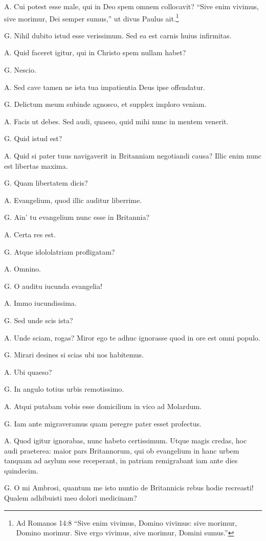 \documentclass{article}
\begin{document}
A. Cui potest esse male, qui in Deo spem omnem collocavit? ``Sive enim vivimus, sive morimur, Dei semper sumus,'' ut divus Paulus ait.\footnote{Ad Romanos 14:8 ``Sive enim vivimus, Domino vivimus: sive morimur, Domino morimur. Sive ergo vivimus, sive morimur, Domini sumus.''}

G. Nihil dubito istud esse verissimum. Sed ea est carnis huius infirmitas.

A. Quid faceret igitur, qui in Christo spem nullam habet?

G. Nescio.

A. Sed cave tamen ne ista tua impatientia Deus ipse offendatur.

G. Delictum meum subinde agnosco, et supplex imploro veniam.

 
A. Facis ut debes. Sed audi, quaeso, quid mihi nunc in mentem venerit.

G. Quid istud est?

A. Quid si pater tuus navigaverit in Britanniam negotiandi causa? Illic enim nunc est libertas maxima.

G. Quam libertatem dicis?

A. Evangelium, quod illic auditur liberrime.

G. Ain' tu evangelium nunc esse in Britannia?

A. Certa res est.

G. Atque idololatriam profligatam?

A. Omnino.

G. O auditu iucunda evangelia!

A. Immo iucundissima.

G. Sed unde scis ista?

A. Unde sciam, rogas? Miror ego te adhuc ignorasse quod in ore est omni populo.

G. Mirari desines si scias ubi nos habitemus.

A. Ubi quaeso?

G. In angulo totius urbis remotissimo.

A. Atqui putabam vobis esse domicilium in vico ad Molardum.

G. Iam ante migraveramus quam peregre pater esset profectus.

A. Quod igitur ignorabas, nunc habeto certissimum. Utque magis credas, hoc audi praeterea: maior pars Britannorum, qui ob evangelium in hanc urbem tanquam ad asylum sese receperant, in patriam remigrabant iam ante dies quindecim.

G. O mi Ambrosi, quantum me isto nuntio de Britannicis rebus hodie recreasti! Qualem adhibuisti meo dolori medicinam?
\end{document}
